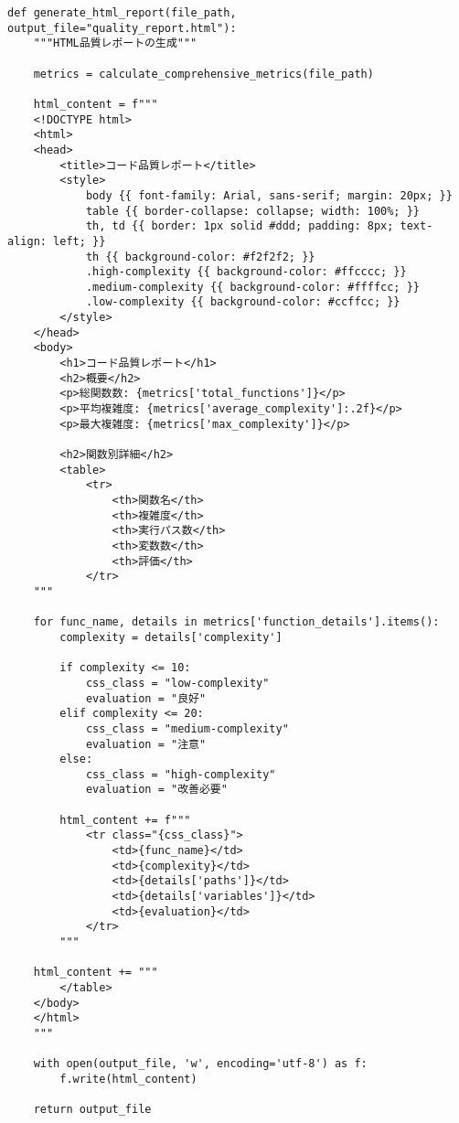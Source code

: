 \documentclass[12pt,a4paper]{article}
\begin{document}
\begin{lstlisting}[caption=HTML品質レポート生成]
def generate_html_report(file_path, output_file="quality_report.html"):
    """HTML品質レポートの生成"""

    metrics = calculate_comprehensive_metrics(file_path)

    html_content = f"""
    <!DOCTYPE html>
    <html>
    <head>
        <title>コード品質レポート</title>
        <style>
            body {{ font-family: Arial, sans-serif; margin: 20px; }}
            table {{ border-collapse: collapse; width: 100%; }}
            th, td {{ border: 1px solid #ddd; padding: 8px; text-align: left; }}
            th {{ background-color: #f2f2f2; }}
            .high-complexity {{ background-color: #ffcccc; }}
            .medium-complexity {{ background-color: #ffffcc; }}
            .low-complexity {{ background-color: #ccffcc; }}
        </style>
    </head>
    <body>
        <h1>コード品質レポート</h1>
        <h2>概要</h2>
        <p>総関数数: {metrics['total_functions']}</p>
        <p>平均複雑度: {metrics['average_complexity']:.2f}</p>
        <p>最大複雑度: {metrics['max_complexity']}</p>

        <h2>関数別詳細</h2>
        <table>
            <tr>
                <th>関数名</th>
                <th>複雑度</th>
                <th>実行パス数</th>
                <th>変数数</th>
                <th>評価</th>
            </tr>
    """

    for func_name, details in metrics['function_details'].items():
        complexity = details['complexity']

        if complexity <= 10:
            css_class = "low-complexity"
            evaluation = "良好"
        elif complexity <= 20:
            css_class = "medium-complexity"
            evaluation = "注意"
        else:
            css_class = "high-complexity"
            evaluation = "改善必要"

        html_content += f"""
            <tr class="{css_class}">
                <td>{func_name}</td>
                <td>{complexity}</td>
                <td>{details['paths']}</td>
                <td>{details['variables']}</td>
                <td>{evaluation}</td>
            </tr>
        """

    html_content += """
        </table>
    </body>
    </html>
    """

    with open(output_file, 'w', encoding='utf-8') as f:
        f.write(html_content)

    return output_file
\end{lstlisting}
\end{document}
